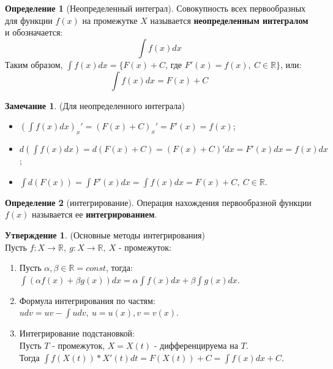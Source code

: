 \documentclass{report}
\theoremstyle{definition}
\newtheorem{definition}{Определение}[section]
\newtheorem{statement}{Утверждение}[section]
\newtheorem*{remark}{Замечание}
\begin{document}
\begin{definition}[Неопределенный интеграл]
  Совокупность всех первообразных для функции \(f(x)\) на промежутке \(X\) называется
  \textbf{неопределенным интегралом} и обозначается:
  \begin{equation*}
    \int f(x) dx
  \end{equation*}
  Таким образом, \(\int f(x) dx = \{F(x) + C\), где \(F'(x) = f(x), \ C \in \mathbb{R}\}\),
  или:
  \begin{equation*}
    \int f(x) dx = F(x) + C
  \end{equation*}
\end{definition}

\begin{remark}
  (Для неопределенного интеграла)
  \begin{itemize}
    \item \((\int f(x) dx)_{x}' = (F(x) + C)_{x}' = F'(x) = f(x)\);
    \item \(d(\int f(x) dx) = d(F(x) + C) = (F(x) + C)' dx = F'(x) dx = f(x) dx\);
    \item \(\int d(F(x)) = \int F'(x) dx = \int f(x) dx = F(x) + C, \ C \in \mathbb{R}\).
  \end{itemize}
\end{remark}

\begin{definition}[интегрирование]
  Операция нахождения первообразной функции \(f(x)\) называется ее \textbf{интегрированием}.
\end{definition}

\begin{statement}
  (Основные методы интегрирования) \\
  Пусть \(f: X \rightarrow \mathbb{R}, \ g:X \rightarrow \mathbb{R}, \ X\) - промежуток:
  \begin{enumerate}
    \item Пусть \(\alpha, \beta \in \mathbb{R} = const\), тогда:\\
          \(\int (\alpha f(x) + \beta g(x)) dx = \alpha \int f(x) dx + \beta \int g(x) dx\).
    \item Формула интегрирования по частям: \\
          \(udv = uv - \int udv, \ u = u(x), v = v(x)\).
    \item Интегрирование подстановкой: \\
          Пусть \(T\) - промежуток, \(X = X(t)\) - дифференцируема на \(T\). \\
          Тогда \(\int f(X(t)) * X'(t) dt = F(X(t)) + C = \int f(x) dx + C\).
  \end{enumerate}
\end{statement}
\end{document}
